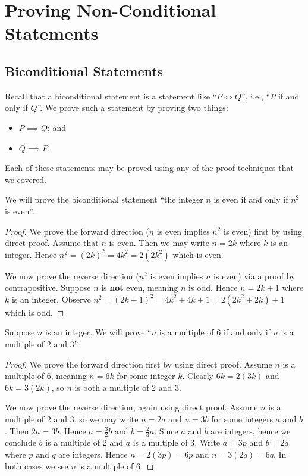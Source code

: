 \section{Proving Non-Conditional Statements}
\subsection{Biconditional Statements}
Recall that a biconditional statement is a statement like ``$P \iff Q$'', i.e., ``$P$ if and only if $Q$''. We prove such a statement by proving two things:
\begin{itemize}
    \item $P \implies Q$; and
    \item $Q \implies P$.
\end{itemize}
Each of these statements may be proved using any of the proof techniques that we covered.

\begin{example}
    We will prove the biconditional statement ``the integer $n$ is even if and only if $n^2$ is even''.
    \begin{proof}
        We prove the forward direction ($n$ is even implies $n^2$ is even) first by using direct proof. Assume that $n$ is even. Then we may write $n = 2k$ where $k$ is an integer. Hence $n^2 = (2k)^2 = 4k^2 = 2(2k^2)$ which is even.

        We now prove the reverse direction ($n^2$ is even implies $n$ is even) via a proof by contrapositive. Suppose $n$ is \textbf{not} even, meaning $n$ is odd. Hence $n = 2k + 1$ where $k$ is an integer. Observe $n^2 = (2k+1)^2 = 4k^2 + 4k + 1 = 2(2k^2 + 2k) + 1$ which is odd.
    \end{proof}
\end{example}
\begin{example}
    Suppose $n$ is an integer. We will prove ``$n$ is a multiple of 6 if and only if $n$ is a multiple of 2 and 3''.
    \begin{proof}
        We prove the forward direction first by using direct proof. Assume $n$ is a multiple of 6, meaning $n = 6k$ for some integer $k$. Clearly $6k = 2(3k)$ and $6k = 3(2k)$, so $n$ is both a multiple of 2 and 3.
        
        We now prove the reverse direction, again using direct proof. Assume $n$ is a multiple of 2 and 3, so we may write $n = 2a$ and $n = 3b$ for some integers $a$ and $b$. Then $2a = 3b$. Hence $a = \frac 32 b$ and $b = \frac 23 a$. Since $a$ and $b$ are integers, hence we conclude $b$ is a multiple of 2 and $a$ is a multiple of 3. Write $a = 3p$ and $b = 2q$ where $p$ and $q$ are integers. Hence $n = 2(3p) = 6p$ and $n = 3(2q) = 6q$. In both cases we see $n$ is a multiple of 6.
    \end{proof}
\end{example}

